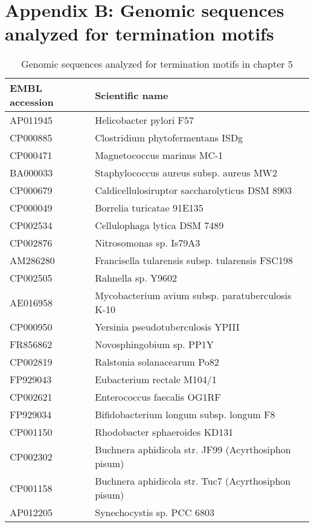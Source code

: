 \chapter{Appendix B: Genomic sequences analyzed for termination motifs}
\ifpdf
    \graphicspath{{AppendixB/AppendixBFigs/EPS/}{AppendixB/AppendixBFigs/}}
\fi

\begingroup
  \centering
     \tiny
   \noindent
  \begin{longtable}{ll}
  \caption{Genomic sequences analyzed for termination motifs in chapter 5}   
  \\ 
    \toprule
    \textbf{EMBL accession} & \textbf{Scientific name} \\
    \midrule
AP011945 & Helicobacter pylori F57\\
CP000885 & Clostridium phytofermentans ISDg\\
CP000471 & Magnetococcus marinus MC-1\\
BA000033 & Staphylococcus aureus subsp. aureus MW2\\
CP000679 & Caldicellulosiruptor saccharolyticus DSM 8903\\
CP000049 & Borrelia turicatae 91E135\\
CP002534 & Cellulophaga lytica DSM 7489\\
CP002876 & Nitrosomonas sp. Is79A3\\
AM286280 & Francisella tularensis subsp. tularensis FSC198\\
CP002505 & Rahnella sp. Y9602\\
AE016958 & Mycobacterium avium subsp. paratuberculosis K-10\\
CP000950 & Yersinia pseudotuberculosis YPIII\\
FR856862 & Novosphingobium sp. PP1Y\\
CP002819 & Ralstonia solanacearum Po82\\
FP929043 & Eubacterium rectale M104/1\\
CP002621 & Enterococcus faecalis OG1RF\\
FP929034 & Bifidobacterium longum subsp. longum F8\\
CP001150 & Rhodobacter sphaeroides KD131\\
CP002302 & Buchnera aphidicola str. JF99 (Acyrthosiphon pisum)\\
CP001158 & Buchnera aphidicola str. Tuc7 (Acyrthosiphon pisum)\\
AP012205 & Synechocystis sp. PCC 6803\\

\end{longtable}
